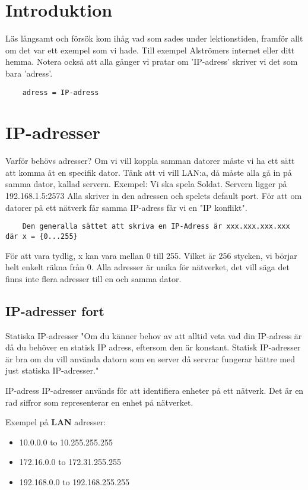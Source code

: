 \documentclass[fleqn]{article}
\begin{document}
\section{Introduktion}
Läs långsamt och försök kom ihåg vad som sades under lektionstiden, framför allt om det var ett exempel som vi hade. Till exempel Alströmers internet eller ditt hemma. Notera också att alla gånger vi pratar om 'IP-adress' skriver vi det som bara 'adress'.
\begin{verbatim}
    adress = IP-adress
\end{verbatim}
\section{IP-adresser}
Varför behövs adresser?
Om vi vill koppla samman datorer måste vi ha ett sätt att komma åt en specifik dator. Tänk att vi vill LAN:a, då måste alla gå in på samma dator, kallad servern. 
Exempel: Vi ska spela Soldat. Servern ligger på 192.168.1.5:2573
Alla skriver in den adressen och spelets default port.
För att om datorer på ett nätverk får samma 
IP-adress får vi en "IP konflikt".
\begin{verbatim}
    Den generalla sättet att skriva en IP-Adress är xxx.xxx.xxx.xxx där x = {0...255}
\end{verbatim}

För att vara tydlig, x kan vara mellan 0 till 255. Vilket är 256 stycken, vi börjar helt enkelt räkna från 0. Alla adresser är unika för nätverket, det vill säga det finns inte flera adresser till en och samma dator.

\subsection{IP-adresser fort}
Statiska IP-adresser
"Om du känner behov av att alltid veta vad din IP-adress är då du behöver en statisk IP adress, eftersom den är konstant. Statisk IP-adresser är bra om du vill använda datorn som en server då servrar fungerar bättre med just statiska IP-adresser."


IP-adress
IP-adresser används för att identifiera enheter på ett nätverk. Det är en rad siffror som representerar en enhet på nätverket.




Exempel på \textbf{LAN} adresser:
\begin{itemize}
	\item 10.0.0.0 to 10.255.255.255
	\item 172.16.0.0 to 172.31.255.255
	\item 192.168.0.0 to 192.168.255.255
\end{itemize}
\end{document}
